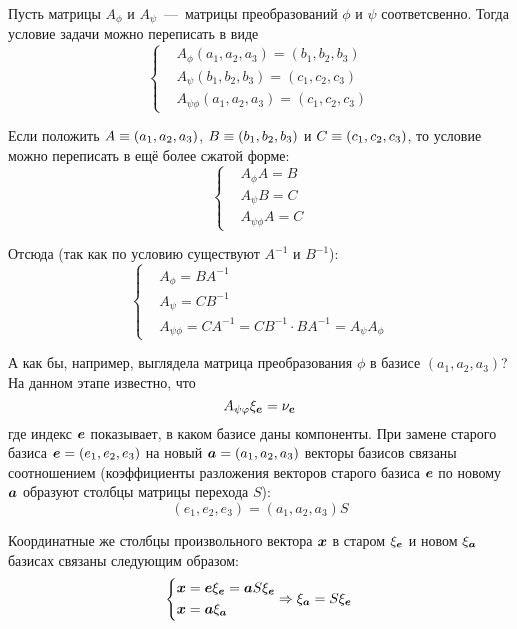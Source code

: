 \documentclass[a4paper,12pt]{article}
\begin{document}
  \begin{solution}
    Пусть матрицы $A_{\phi}$ и $A_{\psi}$~---~матрицы преобразований $\phi$ и $\psi$ соответсвенно.
    Тогда условие задачи можно переписать в виде
    \[
      \left\{
        \begin{aligned}
          &A_{\phi} (a_1, a_2, a_3) = (b_1, b_2, b_3)\\
          &A_{\psi} (b_1, b_2, b_3) = (c_1, c_2, c_3)\\
          &A_{\psi\phi} (a_1, a_2, a_3) = (c_1, c_2, c_3)
        \end{aligned}
      \right.
    \]
    
    Если положить $A \hm\equiv (a_1, a_2, a_3)$, $B \hm\equiv (b_1, b_2, b_3)$ и $C \hm\equiv (c_1, c_2, c_3)$, то условие можно переписать в ещё более сжатой форме:
    \[
      \left\{
        \begin{aligned}
          &A_{\phi} A = B\\
          &A_{\psi} B = C\\
          &A_{\psi\phi} A = C
        \end{aligned}
      \right.
    \]
    
    Отсюда (так как по условию существуют $A^{-1}$ и $B^{-1}$):
    \[
      \left\{
        \begin{aligned}
          &A_{\phi} = B A^{-1}\\
          &A_{\psi} = C B^{-1}\\
          &A_{\psi \phi} = C A^{-1} = CB^{-1} \cdot B A^{-1} = A_{\psi} A_{\phi}
        \end{aligned}
      \right.
    \]
    
    А как бы, например, выглядела матрица преобразования $\phi$ в базисе $(a_1, a_2, a_3)$?
    На данном этапе известно, что
    \[
      A_{\psi\varphi} \xi_{\boldsymbol e} = \nu_{\boldsymbol e}
    \]
    где индекс $\boldsymbol e$ показывает, в каком базисе даны компоненты.
    При замене старого базиса $\bds e \hm= (e_1, e_2, e_3)$ на новый $\bds a \hm= (a_1, a_2, a_3)$ векторы базисов связаны соотношением (коэффициенты разложения векторов старого базиса $\boldsymbol e$ по новому $\boldsymbol a$ образуют столбцы матрицы перехода $S$):
    \[
      (e_1, e_2, e_3) = (a_1, a_2, a_3) S
    \]
    
    Координатные же столбцы произвольного вектора $\boldsymbol x$ в старом $\xi_{\boldsymbol e}$ и новом $\xi_{\boldsymbol a}$ базисах связаны следующим образом:
    \[
      \left\{
        \begin{aligned}
          &\boldsymbol x = \boldsymbol e \xi_{\boldsymbol e} = \boldsymbol a S \xi_{\boldsymbol e}\\
          &\boldsymbol x = \boldsymbol a \xi_{\boldsymbol a}
        \end{aligned}
        \Rightarrow \xi_{\boldsymbol a} = S \xi_{\boldsymbol e}
      \right.
    \]
    

\end{solution}
\end{document}
